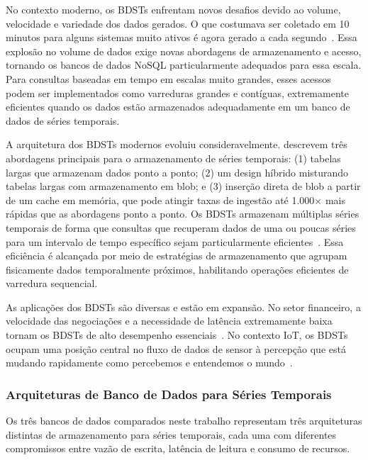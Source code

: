 No contexto moderno, os BDSTs enfrentam novos desafios devido ao volume, velocidade e variedade
dos dados gerados. O que costumava ser coletado em 10 minutos para alguns sistemas muito ativos
é agora gerado a cada segundo~\cite{Dunning2014}. Essa explosão no volume de dados exige novas
abordagens de armazenamento e acesso, tornando os bancos de dados NoSQL particularmente
adequados para essa escala. Para consultas baseadas em tempo em escalas muito grandes, esses
acessos podem ser implementados como varreduras grandes e contíguas, extremamente eficientes
quando os dados estão armazenados adequadamente em um banco de dados de séries temporais.

A arquitetura dos BDSTs modernos evoluiu consideravelmente. \cite{Dunning2014} descrevem três
abordagens principais para o armazenamento de séries temporais: (1) tabelas largas que
armazenam dados ponto a ponto; (2) um design híbrido misturando tabelas largas com armazenamento
em blob; e (3) inserção direta de blob a partir de um cache em memória, que pode atingir taxas
de ingestão até 1.000$\times$ mais rápidas que as abordagens ponto a ponto. Os BDSTs armazenam
múltiplas séries temporais de forma que consultas que recuperam dados de uma ou poucas séries
para um intervalo de tempo específico sejam particularmente eficientes~\cite{Dunning2014}.
Essa eficiência é alcançada por meio de estratégias de armazenamento que agrupam fisicamente
dados temporalmente próximos, habilitando operações eficientes de varredura sequencial.

As aplicações dos BDSTs são diversas e estão em expansão. No setor financeiro, a velocidade das
negociações e a necessidade de latência extremamente baixa tornam os BDSTs de alto desempenho
essenciais~\cite{Dunning2014}. No contexto IoT, os BDSTs ocupam uma posição central no fluxo de
dados de sensor à percepção que está mudando rapidamente como percebemos e entendemos o
mundo~\cite{Dunning2014}.

\subsubsection{Arquiteturas de Banco de Dados para Séries Temporais}

Os três bancos de dados comparados neste trabalho representam três arquiteturas distintas de
armazenamento para séries temporais, cada uma com diferentes compromissos entre vazão de escrita,
latência de leitura e consumo de recursos.

